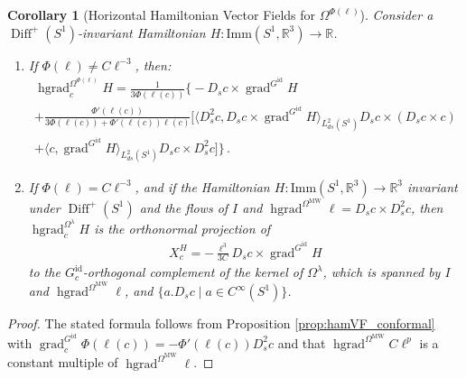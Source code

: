 \documentclass[12pt]{amsart}
\newcommand{\rev}[1]{#1}
\newtheorem{corollary}[theorem]{Corollary}
\theoremstyle{definition}
\newcommand{\R}{\mathbb R}
\newcommand{\Diffp}{\operatorname{Diff}^+(S^1)}
\newcommand{\id}{\mathrm{id}}
\newcommand{\Imm}{\mathrm{Imm}}
\newcommand{\OmMW}{\Omega^{\operatorname{MW}}}
\def\la{\lambda}
\def\Ph{\Phi}
\def\Om{\Omega}
\def\x{\times}
\def\R{{\mathbb R}}
\let\on=\operatorname
\begin{document}
\begin{corollary}
    [Horizontal Hamiltonian Vector Fields for $\Om^{\Ph(\ell)}$]
\label{cor:hamVF_Gphi}
    Consider a $\Diffp$-invariant Hamiltonian $H\colon \Imm(S^1,\R^3)\to \rev{\R}$. 
\begin{enumerate}[label=(\alph*)]
     \item \label{cor:hamVF_Gphi_casea}  If $\Ph(\ell)\ne C\ell^{-3}$, then:
\begin{multline}\label{eq:ham_flow_length_weight}
    \on{hgrad}_c^{\Om^{\Ph(\ell)}}H
    =\frac{1}{3\Phi(\rev{\ell(c)})} \Bigg\{ - D_s c\x \on{grad}^{G^\id} H \\
    +  \frac{\Phi'(\rev{\ell(c)})}{3\Phi(\rev{\ell(c)})+\Ph'(\rev{\ell(c)})\rev{\ell(c)}} \Big[ \langle D_s^2 c, D_s c\x \on{grad}^{G^\id} H\rangle_{L^2_{ds}(S^1)} D_s c \x (D_s c \x c) \\
     + \langle  c,  \on{grad}^{G^\id} H\rangle_{L^2_{ds}(S^1)} D_s c\x D^2_s c \Big]\Bigg\}\,.
\end{multline}
\item \label{cor:hamVF_Gphi_caseb} If $\Ph(\ell)= C\ell^{-3}$, and if the Hamiltonian $H\colon \Imm(S^1,\R^3)\to \R^3$ invariant under $\Diffp$ and the flows of $I$ and $\on{hgrad}^{\OmMW}\ell= D_sc\x D_s^2 c$, then $\on{hgrad}^{\Om^\la}_cH$ is the orthonormal projection of 
\begin{align}
    X^H_c
    =-\frac{\ell^3}{3 C} D_s c\x \on{grad}^{G^\id}H
\end{align}
to the $G^\id_c$-orthogonal complement of the kernel of $\Om^\la$, which is spanned by  $I$ and $\on{hgrad}^{\OmMW}\ell$, and $\{a.D_s c \mid a\in C^\infty(S^1)\}$.
\end{enumerate}
\end{corollary}

\begin{proof}
    The stated formula follows from Proposition \ref{prop:hamVF_conformal} with $\on{grad}_c^{G^\id}\Phi(\rev{\ell(c)})=-\Phi'(\rev{\ell(c)})D_s^2 c$ and that $\on{hgrad}^{\OmMW}C\ell^{p}$ is a constant multiple of $\on{hgrad}^{\OmMW}\ell$.
\end{proof}
\end{document}
